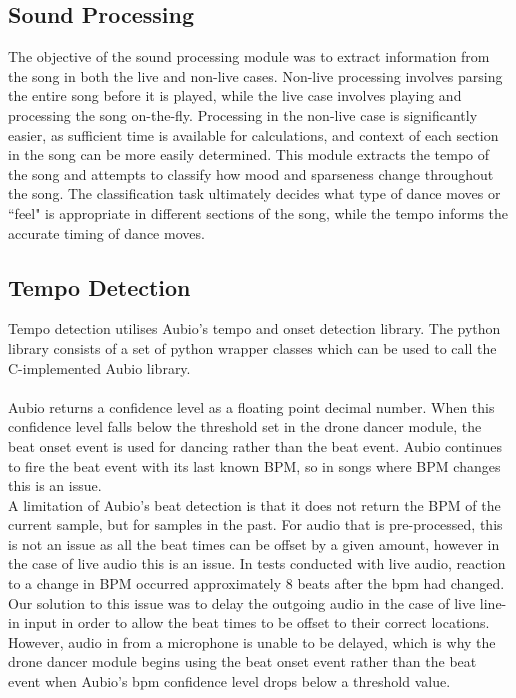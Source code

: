 \subsection{Sound Processing}



The objective of the sound processing module was to extract information from the song in both the live and non-live cases. Non-live processing involves parsing the entire song before it is played, while the live case involves playing and processing the song on-the-fly. Processing in the non-live case is significantly easier, as sufficient time is available for calculations, and context of each section in the song can be more easily determined. This module extracts the tempo of the song and attempts to classify how mood and sparseness change throughout the song. The classification task ultimately decides what type of dance moves or ``feel" is appropriate in different sections of the song, while the tempo informs the accurate timing of dance moves.

\subsection{Tempo Detection}
Tempo detection utilises Aubio's tempo and onset detection library. The python library consists of a set of python wrapper classes which can be used to call the C-implemented Aubio library. \\
\\
Aubio returns a confidence level as a floating point decimal number. When this confidence level falls below the
threshold set in the drone dancer module, the beat onset event is used for dancing rather than the beat event.
Aubio continues to fire the beat event with its last known BPM, so in songs where BPM changes this is an issue.
\\
A limitation of Aubio's beat detection is that it does not return the BPM of the current sample, but for samples
in the past. For audio that is pre-processed, this is not an issue as all the beat times can be offset by a given
amount, however in the case of live audio this is an issue. In tests conducted with live audio, reaction to a
change in BPM occurred approximately 8 beats after the bpm had changed. Our solution to this issue was to delay
the outgoing audio in the case of live line-in input in order to allow the beat times to be offset to their
correct locations. However, audio in from a microphone is unable to be delayed, which is why the drone dancer
module begins using the beat onset event rather than the beat event when Aubio's bpm confidence level drops below
a threshold value.


